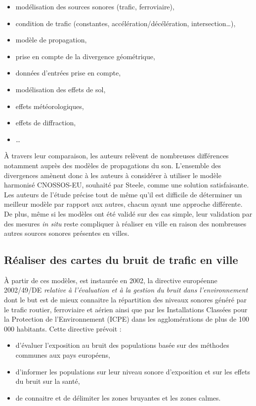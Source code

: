 \begin{itemize}
\item modélisation des sources sonores (trafic, ferroviaire),
\item condition de trafic (constantes, accélération/décélération, intersection\dots),
\item modèle de propagation,
\item prise en compte de la divergence géométrique,
\item données d'entrées prise en compte,
\item modélisation des effets de sol,
\item effets météorologiques,
\item effets de diffraction,
\item \dots  \\
\end{itemize}

À travers leur comparaison, les auteurs relèvent de nombreuses différences notamment auprès des modèles de propagations du son. 
L'ensemble des divergences amènent donc à les auteurs à considérer à utiliser le modèle harmonisé CNOSSOS-EU, souhaité par Steele, comme une solution satisfaisante. Les auteurs de l'étude précise tout de même qu'il est difficile de déterminer un \og meilleur \fg{} modèle par rapport aux autres, chacun ayant une approche différente. De plus, même si les modèles ont été validé sur des cas simple, leur validation par des mesures \textit{in situ} reste compliquer à réaliser en ville en raison des nombreuses autres sources sonores présentes en villes. 


\subsection{Réaliser des cartes du bruit de trafic en ville}

À partir de ces modèles, est instaurée en 2002, la directive européenne 2002/49/DE \textit{relative à l'évaluation et à la gestion du bruit dans l'environnement} dont le but est de mieux connaitre la répartition des niveaux sonores généré par le trafic routier, ferroviaire et aérien ainsi que par les Installations Classées pour la Protection de l'Environnement (ICPE) dans les agglomérations de plus de 100 000 habitants. Cette directive prévoit :

\begin{itemize}
	\item d'évaluer l'exposition au bruit des populations basée sur des méthodes communes aux pays européens,
	\item d'informer les populations sur leur niveau sonore d'exposition et sur les effets du bruit sur la santé,
	\item de connaitre et de délimiter les zones bruyantes et les zones calmes.\\
\end{itemize}

